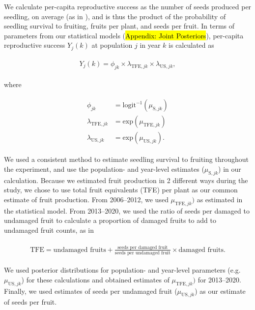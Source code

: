 \documentclass[12pt, oneside]{article}   	%
\begin{document}
We calculate per-capita reproductive success as the number of seeds produced per seedling, on average (as in \cite{venable2007,gremer2014}), and is thus the product of the probability of seedling survival to fruiting, fruits per plant, and seeds per fruit. In terms of parameters from our statistical models (\hl{Appendix: Joint Posteriors}), per-capita reproductive success $Y_{j}(k)$ at population $j$ in year $k$ is calculated as

\begin{align}
  \begin{split}
Y_{j}(k) = \phi_{jk} \times \lambda_{\mathrm{TFE},jk} \times \lambda_{\mathrm{US},jk}, \label{eq:percapitars}
  \end{split}
\end{align}

where

\begin{align}
  \begin{split}
\phi_{jk} & = \mathrm{logit}^{-1}(\mu_{\mathrm{S},jk}) \\
\lambda_{\mathrm{TFE},jk} & = \mathrm{exp}(\mu_{\mathrm{TFE},jk}) \\
\lambda_{\mathrm{US},jk} & = \mathrm{exp}(\mu_{\mathrm{US},jk}). 
  \end{split}
\end{align}

We used a consistent method to estimate seedling survival to fruiting throughout the experiment, and use the population- and year-level estimates ($\mu_{\mathrm{S},jk}$) in our calculation. Because we estimated fruit production in 2 different ways during the study, we chose to use total fruit equivalents (TFE) per plant as our common estimate of fruit production. From 2006--2012, we used $\mu_{\mathrm{TFE},jk})$ as estimated in the statistical model. From 2013--2020, we used the ratio of seeds per damaged to undamaged fruit to calculate a proportion of damaged fruits to add to undamaged fruit counts, as in 

\begin{align}
\begin{split}
\textrm{TFE} = \textrm{undamaged fruits} + \frac{\textrm{seeds per damaged fruit}}{\textrm{seeds per undamaged fruit}}\times  \textrm{damaged fruits} .
  \end{split}
\end{align}

We used posterior distributions for population- and year-level parameters (e.g. $\mu_{\mathrm{US},jk}$) for these calculations and obtained estimates of $\mu_{\mathrm{TFE},jk})$ for 2013--2020. Finally, we used estimates of seeds per undamaged fruit ($\mu_{\mathrm{US},jk}$) as our estimate of seeds per fruit.
\end{document}
